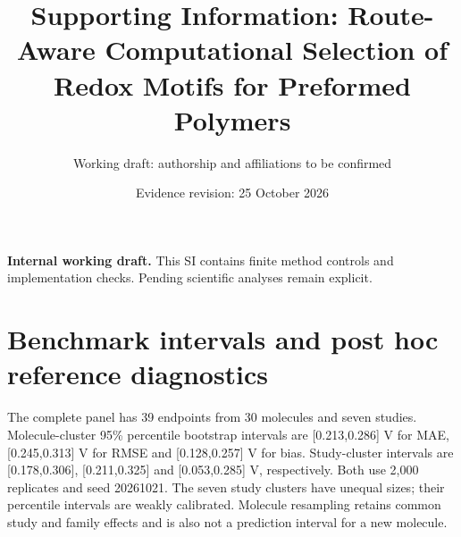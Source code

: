 \documentclass[11pt]{article}
\title{Supporting Information: Route-Aware Computational Selection of Redox Motifs for Preformed Polymers}
\author{Working draft: authorship and affiliations to be confirmed}
\date{Evidence revision: 25 October 2026}
\begin{document}
\maketitle
\noindent\textbf{Internal working draft.} This SI contains finite method controls and implementation checks. Pending scientific analyses remain explicit.
\section{Benchmark intervals and post hoc reference diagnostics}
The complete panel has 39 endpoints from 30 molecules and seven studies. Molecule-cluster 95\% percentile bootstrap intervals are [0.213,0.286] V for MAE, [0.245,0.313] V for RMSE and [0.128,0.257] V for bias. Study-cluster intervals are [0.178,0.306], [0.211,0.325] and [0.053,0.285] V, respectively. Both use 2,000 replicates and seed 20261021. The seven study clusters have unequal sizes; their percentile intervals are weakly calibrated. Molecule resampling retains common study and family effects and is also not a prediction interval for a new molecule.
\end{document}
